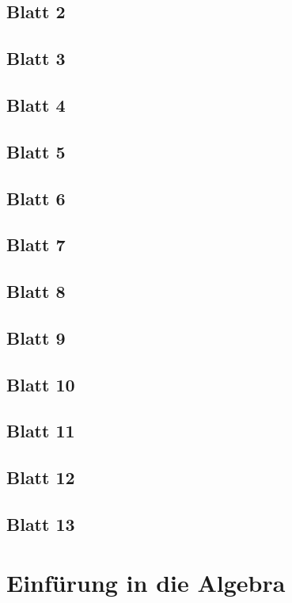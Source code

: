 \documentclass{tuftebook}
\numberwithin{Theorem}{chapter}
\theoremstyle{definition}
\theoremstyle{definition}
\begin{document}
\section{Blatt 2}

\section{Blatt 3}

\section{Blatt 4}

\section{Blatt 5}

\section{Blatt 6}

\section{Blatt 7}

\section{Blatt 8}

\section{Blatt 9}

\section{Blatt 10}

\section{Blatt 11}

\section{Blatt 12}

\section{Blatt 13}


\chapter{Einf\"{u}rung in die Algebra}
\end{document}
